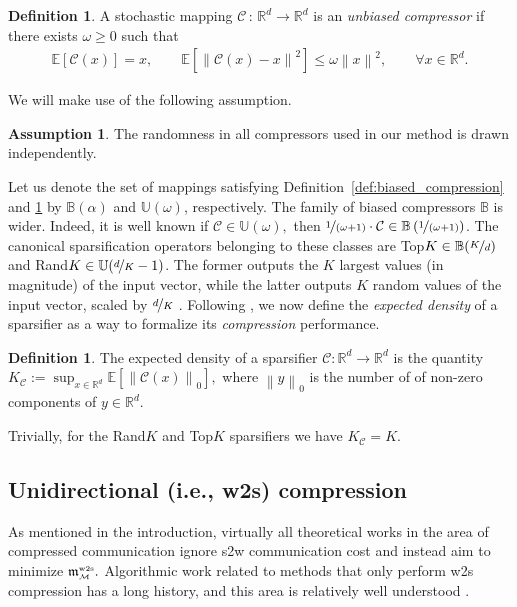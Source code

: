 \documentclass{article} %
\newcommand{\norm}[1]{\left\| #1 \right\|}
\newcommand{\R}{\mathbb{R}} %
\newcommand{\Exp}[1]{{\mathbb{E}}\left[#1\right]}
\newcommand{\cC}{\mathcal{C}}
\newcommand{\cM}{\mathcal{M}}
\theoremstyle{plain}
\theoremstyle{definition}
\newtheorem{definition}[theorem]{Definition}
\newtheorem{assumption}[theorem]{Assumption}
\theoremstyle{remark}
\newcommand{\eqdef}{:=}
\begin{document}
\begin{definition}
  \label{def:unbiased_compression}
  A stochastic mapping $\cC\,:\,\R^d \rightarrow \R^d$ is an \textit{unbiased compressor} if
  there exists $\omega \geq 0$ such that
  \begin{align}
      \label{eq:compressor}
      \Exp{\cC(x)} = x, \qquad \Exp{\norm{\cC(x) - x}^2} \leq \omega \norm{x}^2, \qquad \forall x \in \R^d.
  \end{align}
\end{definition}

We will make use of the following assumption. 
\begin{assumption}
  \label{ass:unbiased_compressors}
The randomness in all compressors used in our method is drawn independently.
\end{assumption}

Let us denote the set of mappings satisfying Definition~\ref{def:biased_compression} and \ref{def:unbiased_compression} by $\mathbb{B}(\alpha)$ and $\mathbb{U}(\omega)$, respectively. The family of biased compressors $\mathbb{B}$ is wider. Indeed, it is well known if $\cC \in \mathbb{U}(\omega),$ then $\nicefrac{1}{(\omega + 1)} \cdot \cC \in \mathbb{B}\left(\nicefrac{1}{(\omega + 1)}\right)$. The canonical sparsification operators belonging to these classes are Top$K \in \mathbb{B}(\nicefrac{K}{d})$ and Rand$K \in \mathbb{U}(\nicefrac{d}{K} - 1)$. The former  outputs the $K$ largest values (in magnitude) of the input vector, while the latter outputs $K$ random values of the input vector, scaled by $\nicefrac{d}{K}$ \citep{beznosikov2020biased}.  Following \citep{MARINA,tyurin2022dasha}, we now define the {\em expected density} of a sparsifier as a way to  formalize its {\em compression} performance.
\begin{definition}
  \label{def:expected_density}
The expected density of a sparsifier $\cC:\R^d\to \R^d$ is the quantity $K_{\cC}\eqdef\sup_{x \in \R^d} \Exp{\norm{\cC(x)}_0},$ where $\norm{y}_0$ is the number of of non-zero components of $y \in \R^d.$
\end{definition}
Trivially, for the Rand$K$ and Top$K$ sparsifiers we have  $K_{\cC} = K.$

\subsection{Unidirectional (i.e., w2s) compression}
\label{sec:worker_to_server}

As mentioned in the introduction, virtually all theoretical works in the area of compressed communication ignore s2w communication cost and instead aim to minimize $\mathfrak{m}^{{\scriptscriptstyle \textnormal{w2s}}}_{{\scriptscriptstyle \cM}}.$  Algorithmic work related to methods that only perform w2s compression has a long history, and this area is  relatively well understood \citep{alistarh2017qsgd,DIANA,richtarik2021ef21}. 
\end{document}

